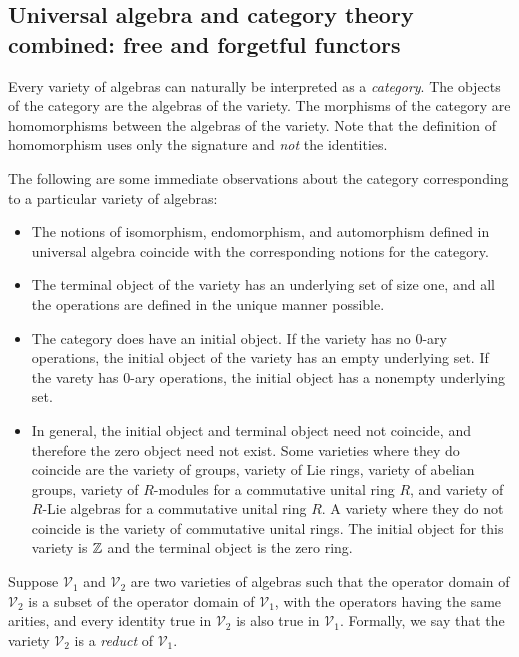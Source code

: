 \subsection{Universal algebra and category theory combined: free and forgetful functors}\label{appsec:free-forgetful}

Every variety of algebras can naturally be interpreted as a {\em
  category}. The objects of the category are the algebras of the
variety. The morphisms of the category are homomorphisms between the
algebras of the variety. Note that the definition of homomorphism uses
only the signature and {\em not} the identities.

The following are some immediate observations about the category
corresponding to a particular variety of algebras:

\begin{itemize}
\item The notions of isomorphism, endomorphism, and automorphism
  defined in universal algebra coincide with the corresponding notions
  for the category.
\item The terminal object of the variety has an underlying set of size
  one, and all the operations are defined in the unique manner
  possible.
\item The category does have an initial object. If the variety has no
  0-ary operations, the initial object of the variety has an empty
  underlying set. If the varety has 0-ary operations, the initial
  object has a nonempty underlying set.
\item In general, the initial object and terminal object need not
  coincide, and therefore the zero object need not exist. Some
  varieties where they do coincide are the variety of groups, variety
  of Lie rings, variety of abelian groups, variety of $R$-modules for
  a commutative unital ring $R$, and variety of $R$-Lie algebras for a
  commutative unital ring $R$. A variety where they do not coincide is
  the variety of commutative unital rings. The initial object for this
  variety is $\mathbb{Z}$ and the terminal object is the zero ring.
\end{itemize}

Suppose $\mathcal{V}_1$ and $\mathcal{V}_2$ are two varieties of
algebras such that the operator domain of $\mathcal{V}_2$ is a subset
of the operator domain of $\mathcal{V}_1$, with the operators having
the same arities, and every identity true in $\mathcal{V}_2$ is also
true in $\mathcal{V}_1$. Formally, we say that the variety
$\mathcal{V}_2$ is a {\em reduct} of $\mathcal{V}_1$.

